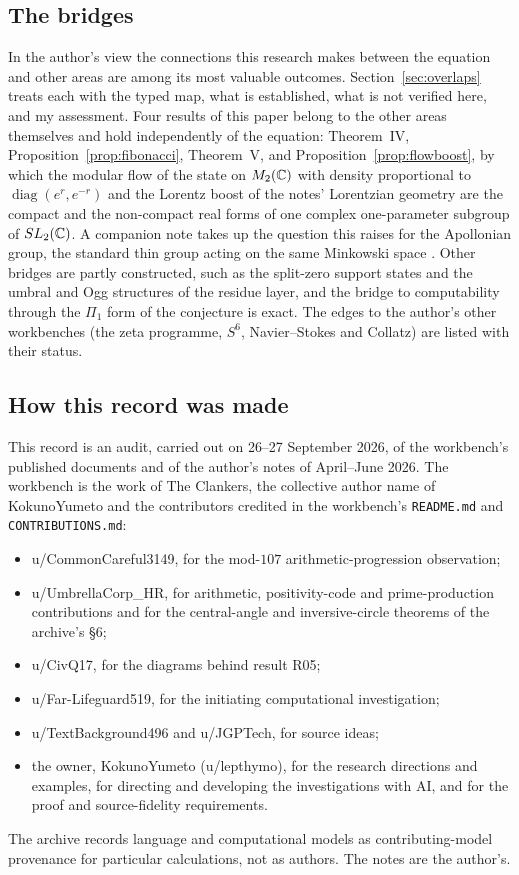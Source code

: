 \subsection*{The bridges}

In the author's view the connections this research makes between the equation and other areas are among its most valuable outcomes. Section~\ref{sec:overlaps} treats each with the typed map, what is established, what is not verified here, and my assessment. Four results of this paper belong to the other areas themselves and hold independently of the equation: Theorem~IV, Proposition~\ref{prop:fibonacci}, Theorem~V, and Proposition~\ref{prop:flowboost}, by which the modular flow of the state on $M_2(\mathbb{C})$ with density proportional to $\operatorname{diag}(e^r,e^{-r})$ and the Lorentz boost of the notes' Lorentzian geometry are the compact and the non-compact real forms of one complex one-parameter subgroup of $SL_2(\mathbb{C})$. A companion note takes up the question this raises for the Apollonian group, the standard thin group acting on the same Minkowski space \cite{ApollonianNote}. Other bridges are partly constructed, such as the split-zero support states and the umbral and Ogg structures of the residue layer, and the bridge to computability through the $\Pi_1$ form of the conjecture is exact. The edges to the author's other workbenches (the zeta programme, $S^6$, Navier--Stokes and Collatz) are listed with their status.

\subsection*{How this record was made}

This record is an audit, carried out on 26--27 September 2026, of the workbench's published documents and of the author's notes of April--June 2026. The workbench is the work of The Clankers, the collective author name of KokunoYumeto and the contributors credited in the workbench's \texttt{README.md} and \texttt{CONTRIBUTIONS.md}:
\begin{itemize}
\item u/CommonCareful3149, for the mod-$107$ arithmetic-progression observation;
\item u/UmbrellaCorp\_HR, for arithmetic, positivity-code and prime-production contributions and for the central-angle and inversive-circle theorems of the archive's §6;
\item u/CivQ17, for the diagrams behind result R05;
\item u/Far-Lifeguard519, for the initiating computational investigation;
\item u/TextBackground496 and u/JGPTech, for source ideas;
\item the owner, KokunoYumeto (u/lepthymo), for the research directions and examples, for directing and developing the investigations with AI, and for the proof and source-fidelity requirements.
\end{itemize}
The archive records language and computational models as contributing-model provenance for particular calculations, not as authors. The notes are the author's.

